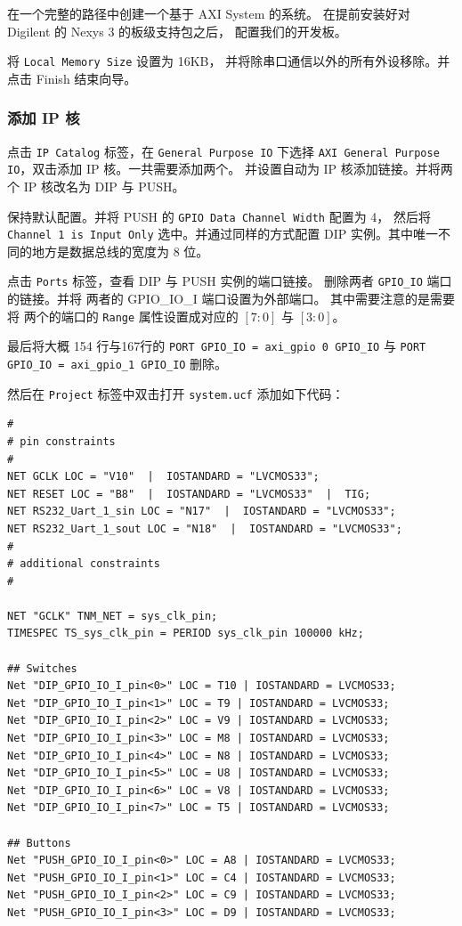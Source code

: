 \documentclass{ctexart}
\begin{document}
        在一个完整的路径中创建一个基于 AXI System 的系统。
        在提前安装好对 Digilent 的 Nexys 3 的板级支持包之后，
        配置我们的开发板。
        
        将 \verb|Local Memory Size| 设置为 16KB，
        并将除串口通信以外的所有外设移除。并点击 Finish
        结束向导。
        
        \subsubsection{添加 IP 核}

        点击 \verb|IP Catalog| 标签，在 \verb|General Purpose IO| 下选择
        \verb|AXI General Purpose IO|，双击添加 IP 核。一共需要添加两个。
        并设置自动为 IP 核添加链接。并将两个 IP 核改名为 DIP 与 PUSH。

        保持默认配置。并将 PUSH 的 \verb|GPIO Data Channel Width| 配置为 4，
        然后将 \verb|Channel 1 is Input Only| 选中。并通过同样的方式配置 DIP
        实例。其中唯一不同的地方是数据总线的宽度为 8 位。

        点击 \verb|Ports| 标签，查看 DIP 与 PUSH 实例的端口链接。
        删除两者 \verb|GPIO_IO| 端口的链接。并将 两者的 GPIO\_IO\_I 端口设置为外部端口。
        其中需要注意的是需要将 两个的端口的 \verb|Range| 属性设置成对应的 
        $[7:0]$ 与 $[3:0]$。

        最后将大概 154 行与167行的
        \lstinline|PORT GPIO_IO = axi_gpio 0 GPIO_IO| 与
        \lstinline|PORT GPIO_IO = axi_gpio_1 GPIO_IO| 删除。

        然后在 \verb|Project| 标签中双击打开 \verb|system.ucf| 
        添加如下代码：
        
\begin{lstlisting}
#
# pin constraints
#
NET GCLK LOC = "V10"  |  IOSTANDARD = "LVCMOS33";
NET RESET LOC = "B8"  |  IOSTANDARD = "LVCMOS33"  |  TIG;
NET RS232_Uart_1_sin LOC = "N17"  |  IOSTANDARD = "LVCMOS33";
NET RS232_Uart_1_sout LOC = "N18"  |  IOSTANDARD = "LVCMOS33";
#
# additional constraints
#

NET "GCLK" TNM_NET = sys_clk_pin;
TIMESPEC TS_sys_clk_pin = PERIOD sys_clk_pin 100000 kHz;

## Switches
Net "DIP_GPIO_IO_I_pin<0>" LOC = T10 | IOSTANDARD = LVCMOS33;
Net "DIP_GPIO_IO_I_pin<1>" LOC = T9 | IOSTANDARD = LVCMOS33;
Net "DIP_GPIO_IO_I_pin<2>" LOC = V9 | IOSTANDARD = LVCMOS33;
Net "DIP_GPIO_IO_I_pin<3>" LOC = M8 | IOSTANDARD = LVCMOS33;
Net "DIP_GPIO_IO_I_pin<4>" LOC = N8 | IOSTANDARD = LVCMOS33;
Net "DIP_GPIO_IO_I_pin<5>" LOC = U8 | IOSTANDARD = LVCMOS33;
Net "DIP_GPIO_IO_I_pin<6>" LOC = V8 | IOSTANDARD = LVCMOS33;
Net "DIP_GPIO_IO_I_pin<7>" LOC = T5 | IOSTANDARD = LVCMOS33;

## Buttons
Net "PUSH_GPIO_IO_I_pin<0>" LOC = A8 | IOSTANDARD = LVCMOS33;
Net "PUSH_GPIO_IO_I_pin<1>" LOC = C4 | IOSTANDARD = LVCMOS33;
Net "PUSH_GPIO_IO_I_pin<2>" LOC = C9 | IOSTANDARD = LVCMOS33; 
Net "PUSH_GPIO_IO_I_pin<3>" LOC = D9 | IOSTANDARD = LVCMOS33;
\end{lstlisting}
\end{document}

